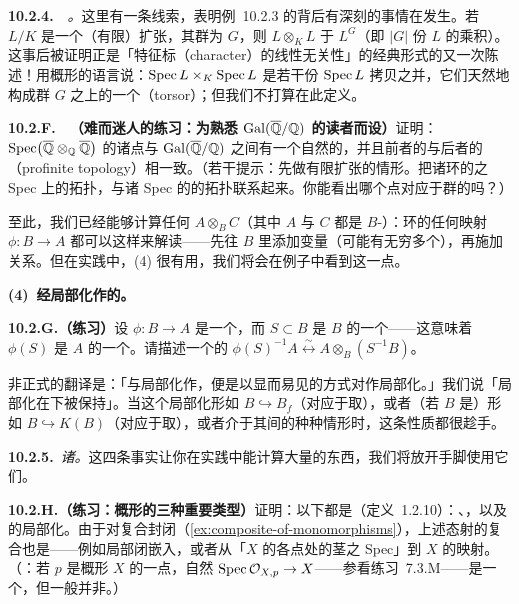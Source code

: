 \textbf{10.2.4.}\ \hard\ \emph{\trhRemark{}。}\quad 这里有一条线索，表明例~10.2.3 的背后有深刻的事情在发生。若 $L/K$ 是一个（有限）\trGalois{}扩张，其\trGalois{}群为 $G$，则 $L\otimes_K L$ \trIsomorphic{}于 $L^G$（即 $|G|$ 份 $L$ 的乘积）。这事后被证明正是「特征标（character）的线性无关性」的经典形式的又一次陈述！用概形的语言说：$\operatorname{Spec} L\times_K\operatorname{Spec} L$ 是若干份 $\operatorname{Spec} L$ 拷贝之并，它们天然地构成\trGalois{}群 $G$ 之上的一个\textbf{\trTorsor{}}（torsor）；但我们不打算在此定义\trTorsor{}。

\textbf{10.2.F.}\ \hard\ \textbf{（难而迷人的练习：为熟悉 $\operatorname{Gal}(\overline{\mathbb{Q}}/\mathbb{Q})$ 的读者而设）}\quad 证明：$\operatorname{Spec}\bigl(\overline{\mathbb{Q}}\otimes_{\mathbb{Q}}\overline{\mathbb{Q}}\bigr)$ 的诸点与 $\operatorname{Gal}(\overline{\mathbb{Q}}/\mathbb{Q})$ 之间有一个自然的\trBijection，并且前者的\trZariskiTopology{}与后者的\trProfiniteTopology{}（profinite topology）相一致。（若干提示：先做有限\trGalois{}扩张的情形。把诸环的\trDirectLimit{}之 Spec 上的拓扑，与诸 Spec 的\trInverseLimit{}的拓扑联系起来。你能看出哪个点对应于\trGalois{}群的\trUnit{}吗？）

至此，我们已经能够计算任何 $A\otimes_B C$（其中 $A$ 与 $C$ 都是 $B$-\trAlgebra）：环的任何映射 $\phi\colon B\to A$ 都可以这样来解读——先往 $B$ 里添加变量（可能有无穷多个），再施加关系。但在实践中，(4) 很有用，我们将会在例子中看到这一点。

\textbf{(4)~经局部化作\trAffine\trScheme{}的\trBaseChange。}

\textbf{10.2.G.（练习）}\quad 设 $\phi\colon B\to A$ 是一个\trRingMorphism，而 $S\subset B$ 是 $B$ 的一个\trMultiplicativeSubset——这意味着 $\phi(S)$ 是 $A$ 的一个\trMultiplicativeSubset。请描述一个\trNatural{}的\trIsomorphism{} $\phi(S)^{-1}A\overset{\sim}{\longleftrightarrow}A\otimes_B(S^{-1}B)$。

非正式的翻译是：「与局部化作\trFiberProduct，便是以显而易见的方式对\trFiberProduct{}作局部化。」我们说「局部化在\trBaseChange{}下被保持」。当这个局部化形如 $B\hookrightarrow B_f$（对应于取\trDistinguishedOpen），或者（若 $B$ 是\trIntegralDomain）形如 $B\hookrightarrow K(B)$（对应于取\trGenericPoint），或者介于其间的种种情形时，这条性质都很趁手。

\textbf{10.2.5.}\ \emph{诸\trhExample{}。}\quad 这四条事实让你在实践中能计算大量的东西，我们将放开手脚使用它们。

\textbf{10.2.H.（练习：概形\trMonomorphism{}的三种重要类型）}\quad 证明：以下都是\trMonomorphism（定义~1.2.10）：\trOpenEmbedding、\trClosedEmbedding，以及\trAffine\trScheme{}的局部化。由于\trMonomorphism{}对复合封闭（\cref{ex:composite-of-monomorphisms}），上述态射的复合也是\trMonomorphism——例如局部闭嵌入，或者从「$X$ 的各点处的茎之 Spec」到 $X$ 的映射。（\trhCaveat{}：若 $p$ 是概形 $X$ 的一点，自然\trMorphism{} $\operatorname{Spec}\mathcal{O}_{X,p}\to X$——参看\mbox{练习~7.3.M}——是一个\trMonomorphism，但一般并非\trOpenEmbedding。）

